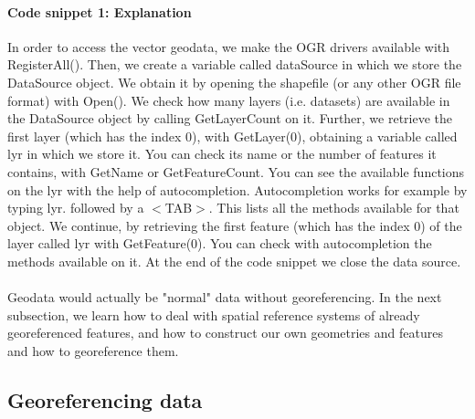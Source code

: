 \documentclass {article}
\begin{document}
\paragraph {Code snippet 1: Explanation}
In order to access the vector geodata, we make the OGR drivers available with RegisterAll(). 
Then, we create a variable called dataSource in which we store the DataSource object. We obtain it by opening the shapefile (or any other OGR file format) with Open(). 
We check how many layers (i.e. datasets) are available in the DataSource object by calling GetLayerCount on it. 
Further, we retrieve the first layer (which has the index 0), with GetLayer(0), obtaining a variable called lyr in which we store it. 
You can check its name or the number of features it contains, with GetName or GetFeatureCount. You can see the available functions on the lyr with the help of autocompletion. Autocompletion works for example by typing lyr. followed by a $<$TAB$>$. This lists all the methods available for that object. 
We continue, by retrieving the first feature (which has the index 0) of the layer called lyr with GetFeature(0). You can check with autocompletion the methods available on it.  
At the end of the code snippet we close the data source.      
\\
\\
Geodata would actually be "normal" data without georeferencing. In the next subsection, we learn how to deal with spatial reference systems of already georeferenced features, and how to construct our own geometries and features and how to georeference them. 

   

\subsection {Georeferencing data}      
\end{document}
